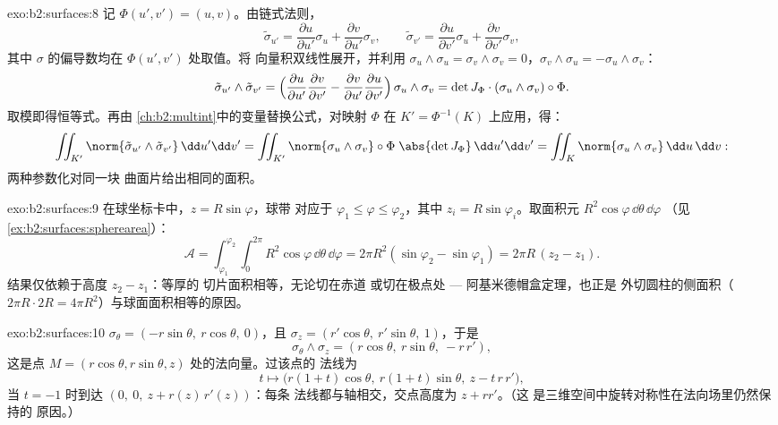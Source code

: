 \begin{solution}{exo:b2:surfaces:8}
记 $\Phi(u', v') = (u, v)$。由链式法则，
\[
\tilde\sigma_{u'} = \frac{\partial u}{\partial u'}\sigma_u
+ \frac{\partial v}{\partial u'}\sigma_v,
\qquad
\tilde\sigma_{v'} = \frac{\partial u}{\partial v'}\sigma_u
+ \frac{\partial v}{\partial v'}\sigma_v ,
\]
其中 $\sigma$ 的偏导数均在 $\Phi(u',v')$ 处取值。将
向量积双线性展开，并利用 $\sigma_u \wedge \sigma_u =
\sigma_v \wedge \sigma_v = 0$，$\sigma_v \wedge \sigma_u =
-\sigma_u \wedge \sigma_v$：
\[
\tilde\sigma_{u'} \wedge \tilde\sigma_{v'}
= \Bigl(\frac{\partial u}{\partial u'}
\frac{\partial v}{\partial v'}
- \frac{\partial v}{\partial u'}
\frac{\partial u}{\partial v'}\Bigr)\,
\sigma_u \wedge \sigma_v
= \det J_\Phi \cdot (\sigma_u \wedge \sigma_v)\circ\Phi .
\]
取模即得恒等式。再由
\cref{ch:b2:multint}中的变量替换公式，对映射 $\Phi$ 在 $K' =
\Phi^{-1}(K)$ 上应用，得：
\[
\iint_{K'} \norm{\tilde\sigma_{u'} \wedge \tilde\sigma_{v'}}
\,\dd u'\dd v'
= \iint_{K'} \norm{\sigma_u \wedge \sigma_v}\circ\Phi\;
\abs{\det J_\Phi}\,\dd u'\dd v'
= \iint_K \norm{\sigma_u \wedge \sigma_v}\,\dd u\,\dd v :
\]
两种参数化对同一块
曲面片给出相同的面积。
\end{solution}

\begin{solution}{exo:b2:surfaces:9}
在球坐标卡中，$z = R\sin\varphi$，球带
对应于 $\varphi_1 \leq \varphi \leq \varphi_2$，其中
$z_i = R\sin\varphi_i$。取面积元
$R^2\cos\varphi\,\dd\theta\,\dd\varphi$
（见\cref{ex:b2:surfaces:spherearea}）：
\[
\mathcal A = \int_{\varphi_1}^{\varphi_2}\!\!\int_0^{2\pi}
R^2\cos\varphi\,\dd\theta\,\dd\varphi
= 2\pi R^2(\sin\varphi_2 - \sin\varphi_1)
= 2\pi R\,(z_2 - z_1) .
\]
结果仅依赖于高度 $z_2 - z_1$：等厚的
切片面积相等，无论切在赤道
或切在极点处 --- 阿基米德帽盒定理，也正是
外切圆柱的侧面积（$2\pi R \cdot
2R = 4\pi R^2$）与球面面积相等的原因。
\end{solution}

\begin{solution}{exo:b2:surfaces:10}
$\sigma_\theta = (-r\sin\theta,\ r\cos\theta,\ 0)$，且
$\sigma_z = (r'\cos\theta,\ r'\sin\theta,\ 1)$，于是
\[
\sigma_\theta \wedge \sigma_z
= (r\cos\theta,\ r\sin\theta,\ -r\,r') ,
\]
这是点 $M = (r\cos\theta, r\sin\theta, z)$ 处的法向量。过该点的
法线为
\[
t \mapsto \bigl(r(1 + t)\cos\theta,\ r(1 + t)\sin\theta,\
z - t\,r\,r'\bigr),
\]
当 $t = -1$ 时到达 $(0,\ 0,\ z + r(z)\,r'(z))$：每条
法线都与轴相交，交点高度为 $z + rr'$。（这
是三维空间中旋转对称性在法向场里仍然保持的
原因。）
\end{solution}


